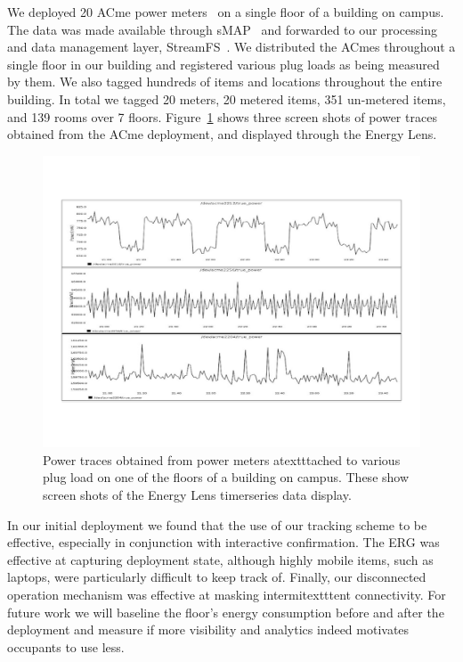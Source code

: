 We deployed 20 ACme power meters~\cite{acme} on a single floor of a building on campus.  The data was made available through
sMAP~\cite{smap} and forwarded to our processing and data management layer, StreamFS~\cite{streamfs}.  We distributed
the ACmes throughout a single floor in our building and registered various plug loads as being measured by them.  We also tagged
hundreds of items and locations throughout the entire building.  In total we tagged 20 meters, 20 metered items, 351 un-metered items,
 and 139 rooms over 7 floors.  Figure~\ref{fig:tsdata} shows three screen shots of power traces obtained from the ACme deployment, and displayed
 through the Energy Lens. 

\begin{figure}[htb!]
\begin{center}
\includegraphics[scale=0.33]{figs/graphs_screen}
\caption{Power traces obtained from power meters atextttached to various plug load on one of the floors of
a building on campus.  These show screen shots of the Energy Lens timerseries data display.}
\label{fig:tsdata}
\end{center}
\end{figure}

In our initial deployment we found that the use of our tracking scheme to be effective, especially in conjunction with
interactive confirmation.  The ERG was effective at capturing deployment state, although highly mobile items, such as laptops,
were particularly difficult to keep track of.  Finally, our disconnected operation mechanism was effective at masking 
intermitextttent connectivity.  For future work we will baseline the floor's energy consumption before and after the deployment 
and measure if more visibility and analytics indeed motivates occupants to use less.

